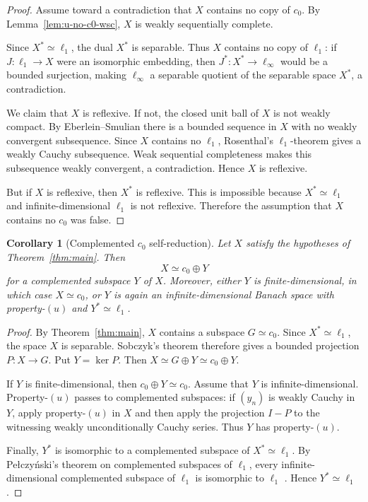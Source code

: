 \documentclass[11pt]{article}
\newtheorem{corollary}{Corollary}
\newcommand{\ellone}{\ell_1}
\newcommand{\ellinf}{\ell_\infty}
\newcommand{\czero}{c_0}
\newcommand{\wuc}{weakly unconditionally Cauchy}
\begin{document}
\begin{proof}
Assume toward a contradiction that \(X\) contains no copy of \(\czero\).
By Lemma~\ref{lem:u-no-c0-wsc}, \(X\) is weakly sequentially complete.

Since \(X^*\simeq \ellone\), the dual \(X^*\) is separable.  Thus \(X\)
contains no copy of \(\ellone\): if \(J:\ellone\to X\) were an isomorphic
embedding, then \(J^*:X^*\to \ellinf\) would be a bounded surjection, making
\(\ellinf\) a separable quotient of the separable space \(X^*\), a
contradiction.

We claim that \(X\) is reflexive.  If not, the closed unit ball of \(X\) is not
weakly compact.  By Eberlein--Smulian there is a bounded sequence in \(X\) with
no weakly convergent subsequence.  Since \(X\) contains no \(\ellone\),
Rosenthal's \(\ellone\)-theorem gives a weakly Cauchy subsequence.  Weak
sequential completeness makes this subsequence weakly convergent, a
contradiction.  Hence \(X\) is reflexive.

But if \(X\) is reflexive, then \(X^*\) is reflexive.  This is impossible
because \(X^*\simeq \ellone\) and infinite-dimensional \(\ellone\) is not
reflexive.  Therefore the assumption that \(X\) contains no \(\czero\) was
false.
\end{proof}

\begin{corollary}[Complemented \(\czero\) self-reduction]\label{cor:self}
Let \(X\) satisfy the hypotheses of Theorem~\ref{thm:main}.  Then
\[
  X \simeq \czero \oplus Y
\]
for a complemented subspace \(Y\) of \(X\).  Moreover, either \(Y\) is
finite-dimensional, in which case \(X\simeq \czero\), or \(Y\) is again an
infinite-dimensional Banach space with property-\((u)\) and
\(Y^*\simeq \ellone\).
\end{corollary}

\begin{proof}
By Theorem~\ref{thm:main}, \(X\) contains a subspace \(G\simeq \czero\).
Since \(X^*\simeq \ellone\), the space \(X\) is separable.  Sobczyk's theorem
therefore gives a bounded projection \(P:X\to G\).  Put \(Y=\ker P\).  Then
\(X\simeq G\oplus Y\simeq \czero\oplus Y\).

If \(Y\) is finite-dimensional, then \(\czero\oplus Y\simeq \czero\).  Assume
that \(Y\) is infinite-dimensional.  Property-\((u)\) passes to complemented
subspaces: if \((y_n)\) is weakly Cauchy in \(Y\), apply property-\((u)\) in
\(X\) and then apply the projection \(I-P\) to the witnessing \wuc{} series.
Thus \(Y\) has property-\((u)\).

Finally, \(Y^*\) is isomorphic to a complemented subspace of
\(X^*\simeq \ellone\).  By Pe\l czy\'nski's theorem on complemented subspaces
of \(\ellone\), every infinite-dimensional complemented subspace of
\(\ellone\) is isomorphic to \(\ellone\) \cite{LT}.  Hence
\(Y^*\simeq \ellone\).
\end{proof}
\end{document}
